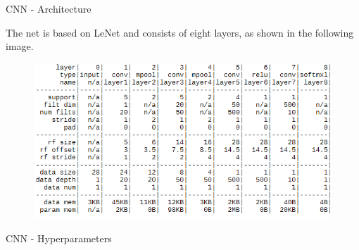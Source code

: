 \begin{tframe}{CNN - Architecture}

The net is based on LeNet and consists of eight layers, as shown in the following image.

\begin{figure}[h]
	\begin{center}
		\includegraphics[width=1\textwidth]{img/cnn.png}
	\end{center}
	\label{fig:cnn}
\end{figure}

\end{tframe}

\begin{tframe}{CNN - Hyperparameters}


\end{tframe}